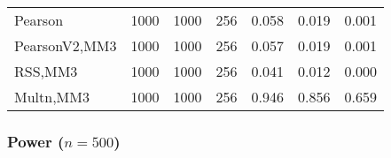 \documentclass[
]{article}
\begin{document}
\begin{table}[H]
{\begin{tabular}[t]{lrrrrrr}
\hspace{1em}Pearson & 1000 & 1000 & 256 & 0.058 & 0.019 & 0.001\\
\hspace{1em}PearsonV2,MM3 & 1000 & 1000 & 256 & 0.057 & 0.019 & 0.001\\
\hspace{1em}RSS,MM3 & 1000 & 1000 & 256 & 0.041 & 0.012 & 0.000\\
\hspace{1em}Multn,MM3 & 1000 & 1000 & 256 & 0.946 & 0.856 & 0.659\\
\bottomrule
\end{tabular}}
\end{table}

\hypertarget{power-n500-3}{%
\subsubsection{\texorpdfstring{Power
(\(n=500\))}{Power (n=500)}}\label{power-n500-3}}
\end{document}
